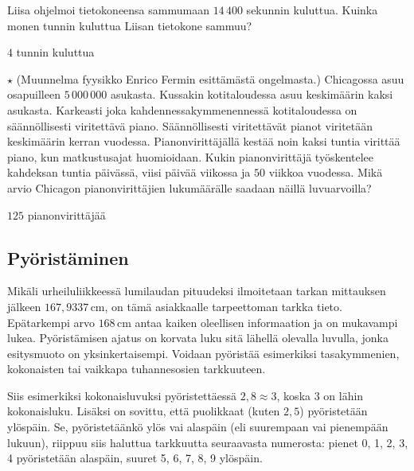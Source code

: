 \begin{tehtavasivu}
\begin{tehtava}
Liisa ohjelmoi tietokoneensa sammumaan $14\,400$ sekunnin kuluttua. Kuinka monen tunnin kuluttua Liisan tietokone sammuu?
\begin{vastaus}
$4$ tunnin kuluttua
\end{vastaus}
\end{tehtava}

\begin{tehtava}
$\star$ (Muunnelma fyysikko Enrico Fermin esittämästä ongelmasta.) Chicagossa asuu osapuilleen $5\,000\,000$ asukasta. Kussakin kotitaloudessa asuu keskimäärin kaksi asukasta. Karkeasti joka kahdennessakymmenennessä kotitaloudessa on säännöllisesti viritettävä piano. Säännöllisesti viritettävät pianot viritetään keskimäärin kerran vuodessa. Pianonvirittäjällä kestää noin kaksi tuntia virittää piano, kun matkustusajat huomioidaan. Kukin pianonvirittäjä työskentelee kahdeksan tuntia päivässä, viisi päivää viikossa ja $50$ viikkoa vuodessa. Mikä arvio Chicagon pianonvirittäjien lukumäärälle saadaan näillä luvuarvoilla?
\begin{vastaus}
$125$ pianonvirittäjää
\end{vastaus}
\end{tehtava}

\end{tehtavasivu}

\subsection*{Pyöristäminen}

Mikäli urheiluliikkeessä lumilaudan pituudeksi ilmoitetaan tarkan mittauksen jälkeen $167,9337$\,cm, on tämä asiakkaalle tarpeettoman tarkka tieto. Epätarkempi arvo $168$\,cm antaa kaiken oleellisen informaation ja on mukavampi lukea. Pyöristämisen ajatus on korvata luku sitä lähellä olevalla luvulla, jonka esitysmuoto on yksinkertaisempi. Voidaan pyöristää esimerkiksi tasakymmenien, kokonaisten tai vaikkapa tuhannesosien tarkkuuteen.



Siis esimerkiksi kokonaisluvuksi pyöristettäessä $2,8 \approx 3$, koska $3$ on lähin kokonaisluku. Lisäksi on sovittu, että puolikkaat (kuten $2,5$) pyöristetään ylöspäin. Se, pyöristetäänkö ylös vai alaspäin (eli suurempaan vai pienempään lukuun), riippuu siis haluttua tarkkuutta seuraavasta numerosta: pienet 0, 1, 2, 3, 4 pyöristetään alaspäin, suuret 5, 6, 7, 8, 9 ylöspäin.

